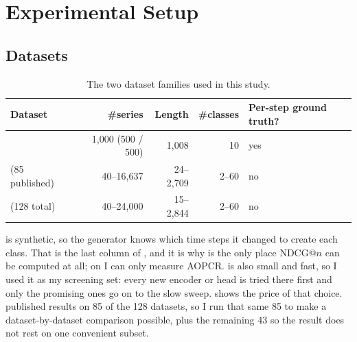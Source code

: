 %

\section{Experimental Setup}
\label{sec:setup}

\subsection{Datasets}
\label{sec:setup:data}

\begin{table}[h]
\caption{The two dataset families used in this study.}
\label{tab:datasets}
\begin{center}
\small
\begin{tabular}{lrrrl}
\toprule
\textbf{Dataset} & \textbf{\#series} & \textbf{Length} & \textbf{\#classes} &
\textbf{Per-step ground truth?} \\
\midrule
\webtraffic{}         & 1{,}000 (500 / 500) & 1{,}008 & 10 & yes \\
\ucr{} (85 published) & 40--16{,}637 & 24--2{,}709 & 2--60 & no \\
\ucr{} (128 total)    & 40--24{,}000 & 15--2{,}844 & 2--60 & no \\
\bottomrule
\end{tabular}
\end{center}
\end{table}

\webtraffic{} \citep{early2024millet} is synthetic, so the generator knows which time steps it
changed to create each class. That is the last column of , and it is why
\webtraffic{} is the only place NDCG@$n$ can be computed at all; on \ucr{} \citep{dau2019ucr} I can
only measure AOPCR. \webtraffic{} is also small and fast, so I used it as my screening set: every
new encoder or head is tried there first and only the promising ones go on to the slow \ucr{} sweep.
 shows the price of that choice. \citet{early2024millet} published \millet{}
results on 85 of the 128 \ucr{} datasets, so I run that same 85 to make a dataset-by-dataset
comparison possible, plus the remaining 43 so the result does not rest on one convenient subset.


